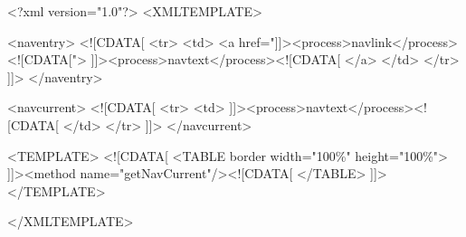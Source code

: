 <?xml version="1.0"?> <XMLTEMPLATE>

<naventry>
    <![CDATA[
    <tr>
     <td>
      <a href="]]><process>navlink</process><![CDATA[">
             ]]><process>navtext</process><![CDATA[
      </a>
     </td>
    </tr>
    ]]>
</naventry>

<navcurrent>
    <![CDATA[
    <tr>
     <td>
       ]]><process>navtext</process><![CDATA[
     </td>
    </tr>
    ]]>
</navcurrent>

<TEMPLATE>
    <![CDATA[
    <TABLE border width="100\%" height="100\%">
      ]]><method name="getNavCurrent"/><![CDATA[
    </TABLE>
    ]]>
</TEMPLATE>

</XMLTEMPLATE>
